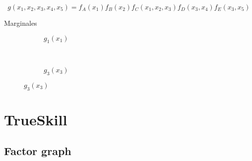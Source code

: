 \documentclass[shownotes]{beamer}
\begin{document}
\begin{frame}

\begin{equation*}
g(x_1,x_2,x_3,x_4,x_5) = f_A(x_1)f_B(x_2)f_C(x_1,x_2,x_3)f_D(x_3,x_4)f_E(x_3,x_5)
\end{equation*}

\vspace{0.1cm}

\begin{center}
Marginales 
\end{center}
\vspace{-0.5cm}
\begin{figure}[H]
\centering
  \begin{subfigure}[b]{0.48\textwidth} 
  \centering
    \scalebox{0.6}{}
    \caption*{$g_1(x_1)$}
  \end{subfigure} 
\ \ \
  \begin{subfigure}[b]{0.48\textwidth} 
  \centering
    \scalebox{0.6}{}
   \caption*{$g_3(x_3)$}
  \end{subfigure} 
\end{figure}
% 
% 
\end{frame}

\section{TrueSkill}

\subsection{Factor graph}
\end{document}
